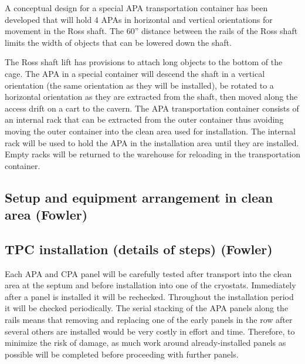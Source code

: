 A conceptual design for a special APA transportation container has been developed that will hold 4 APAs in horizontal and vertical orientations for movement in the Ross shaft. The 60” distance between the rails of the 
Ross shaft limits the width of objects that can be lowered down the shaft. 

The Ross shaft lift has provisions to attach long objects to the bottom of the cage. The APA in a special container will descend the shaft in a vertical orientation 
(the same orientation as they will be installed), be rotated to a horizontal orientation as they are extracted from the shaft, then moved along the access drift on a cart to the cavern. The APA transportation container consists of 
an internal rack that can be extracted from the outer container thus avoiding moving the outer container into the clean area used for installation. The internal rack will be used to hold the APA in the installation area until they 
are installed. Empty racks will be returned to the warehouse for reloading in the transportation container.

\subsection{Setup and equipment arrangement in clean area (Fowler)}
\label{fd:install:fsinstall:setup:cleanarea}

\subsection{TPC installation (details of steps) (Fowler)}
\label{fd:install:fsinstall:tpc:install:steps}

Each APA and CPA panel will be carefully tested after transport into the clean area at the septum and before installation into one of the cryostats. Immediately after a panel is installed it will be rechecked. Throughout the 
installation period it will be checked periodically. The serial stacking of the APA panels along the rails means that removing and replacing one of the early panels in the row after several others are installed would be 
very costly in effort and time. Therefore, to minimize the risk of damage, as much work around already-installed panels as possible will be completed before proceeding with further panels. 

